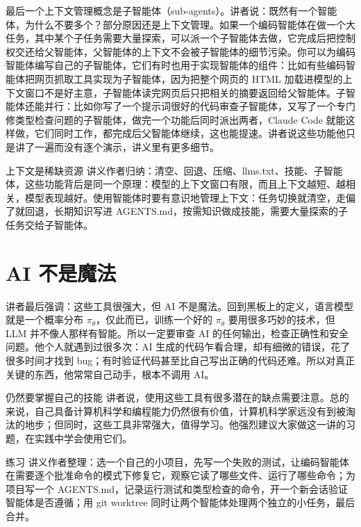 \documentclass[a4paper]{article}
\begin{document}
最后一个上下文管理概念是子智能体（sub-agents）。讲者说：既然有一个智能体，为什么不要多个？部分原因还是上下文管理。如果一个编码智能体在做一个大任务，其中某个子任务需要大量探索，可以派一个子智能体去做，它完成后把控制权交还给父智能体，父智能体的上下文不会被子智能体的细节污染。你可以为编码智能体编写自己的子智能体，它们有时也用于实现智能体的组件：比如有些编码智能体把网页抓取工具实现为子智能体，因为把整个网页的 HTML 加载进模型的上下文窗口不是好主意，子智能体读完网页后只把相关的摘要返回给父智能体。子智能体还能并行：比如你写了一个提示词很好的代码审查子智能体，又写了一个专门修类型检查问题的子智能体，做完一个功能后同时派出两者，Claude Code 就能这样做，它们同时工作，都完成后父智能体继续，这也能提速。讲者说这些功能他只是讲了一遍而没有逐个演示，讲义里有更多细节。

\begin{importantbox}{上下文是稀缺资源}
讲义作者归纳：清空、回退、压缩、llms.txt、技能、子智能体，这些功能背后是同一个原理：模型的上下文窗口有限，而且上下文越短、越相关，模型表现越好。使用智能体时要有意识地管理上下文：任务切换就清空，走偏了就回退，长期知识写进 AGENTS.md，按需知识做成技能，需要大量探索的子任务交给子智能体。
\end{importantbox}

\section{AI 不是魔法}

讲者最后强调：这些工具很强大，但 AI 不是魔法。回到黑板上的定义，语言模型就是一个概率分布 $\pi_\theta$，仅此而已，训练一个好的 $\pi_\theta$ 要用很多巧妙的技术，但 LLM 并不像人那样有智能。所以一定要审查 AI 的任何输出，检查正确性和安全问题。他个人就遇到过很多次：AI 生成的代码乍看合理，却有细微的错误，花了很多时间才找到 bug；有时验证代码甚至比自己写出正确的代码还难。所以对真正关键的东西，他常常自己动手，根本不调用 AI。

\begin{warningbox}{仍然要掌握自己的技能}
讲者说，使用这些工具有很多潜在的缺点需要注意。总的来说，自己具备计算机科学和编程能力仍然很有价值，计算机科学家远没有到被淘汰的地步；但同时，这些工具非常强大，值得学习。他强烈建议大家做这一讲的习题，在实践中学会使用它们。
\end{warningbox}

\begin{practicebox}{练习}
讲义作者整理：选一个自己的小项目，先写一个失败的测试，让编码智能体在需要逐个批准命令的模式下修复它，观察它读了哪些文件、运行了哪些命令；为项目写一个 AGENTS.md，记录运行测试和类型检查的命令，开一个新会话验证智能体是否遵循；用 git worktree 同时让两个智能体处理两个独立的小任务，最后合并。
\end{practicebox}
\end{document}
